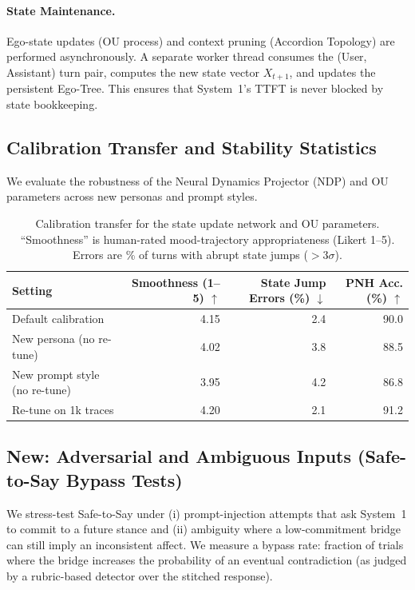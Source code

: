 \documentclass[11pt]{article}
\begin{document}
\paragraph{State Maintenance.} 
Ego-state updates (OU process) and context pruning (Accordion Topology) are performed asynchronously. A separate worker thread consumes the (User, Assistant) turn pair, computes the new state vector $X_{t+1}$, and updates the persistent Ego-Tree. This ensures that System~1's TTFT is never blocked by state bookkeeping.

\subsection{Calibration Transfer and Stability Statistics}
\label{app:construct-validity}
We evaluate the robustness of the Neural Dynamics Projector (NDP) and OU parameters across new personas and prompt styles.

\begin{table}[t]
  \caption{Calibration transfer for the state update network and OU parameters. ``Smoothness'' is human-rated mood-trajectory appropriateness (Likert 1--5). Errors are \% of turns with abrupt state jumps ($>3\sigma$).}
  \label{tab:calibration-transfer-app}
  \centering
  \begin{tabular}{lrrr}
    \toprule
    Setting & Smoothness (1--5) $\uparrow$ & State Jump Errors (\%) $\downarrow$ & PNH Acc. (\%) $\uparrow$ \\
    \midrule
    Default calibration & 4.15 & 2.4 & 90.0 \\
    New persona (no re-tune) & 4.02 & 3.8 & 88.5 \\
    New prompt style (no re-tune) & 3.95 & 4.2 & 86.8 \\
    Re-tune on 1k traces & 4.20 & 2.1 & 91.2 \\
    \bottomrule
  \end{tabular}
\end{table}

\subsection{New: Adversarial and Ambiguous Inputs (Safe-to-Say Bypass Tests)}
\label{app:adversarial}
We stress-test Safe-to-Say under (i) prompt-injection attempts that ask System~1 to commit to a future stance and (ii) ambiguity where a low-commitment bridge can still imply an inconsistent affect.
We measure a bypass rate: fraction of trials where the bridge increases the probability of an eventual contradiction (as judged by a rubric-based detector over the stitched response).
\end{document}
